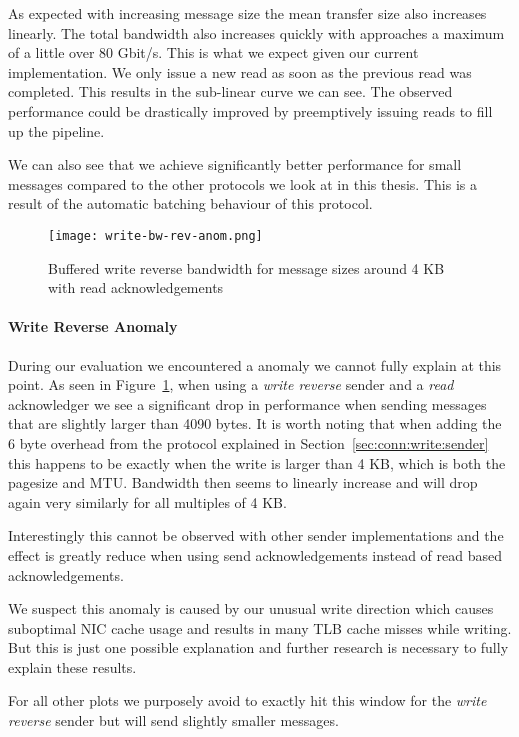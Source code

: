 As expected with increasing message size the mean transfer size also increases linearly. The total bandwidth 
also increases quickly with approaches a maximum of a little over 80 Gbit/s. This is what we expect given our current 
implementation. We only issue a new read as soon as the previous read was completed. This results in the sub-linear
curve we can see. The observed performance could be drastically improved by preemptively issuing reads to fill up
the pipeline.

We can also see that we achieve significantly better performance for small messages compared to the other protocols we
look at in this thesis. This is a result of the automatic batching behaviour of this protocol. 


\begin{figure}[h]
\texttt{[image: write-bw-rev-anom.png]}
\caption{Buffered write reverse bandwidth for message sizes around 4 KB with read acknowledgements}
\label{fig:plot-write-rev-anom}
\end{figure}

\paragraph{Write Reverse Anomaly} During our evaluation we encountered a anomaly we cannot fully explain at
this point. As seen in Figure~\ref{fig:plot-write-rev-anom}, when using a \emph{write reverse} sender and a 
\emph{read} acknowledger we see a significant drop in performance when sending messages that are slightly larger
than 4090 bytes. It is worth noting that when adding the 6 byte overhead from the protocol explained in 
Section~\ref{sec:conn:write:sender} this happens to be exactly when the write is larger than 4 KB, 
which is both the pagesize and MTU. Bandwidth then seems to linearly increase and will drop again very similarly 
for all multiples of 4 KB.

Interestingly this cannot be observed with other sender implementations and the effect is greatly
reduce when using send acknowledgements instead of read based acknowledgements.

We suspect this anomaly is caused by our unusual write direction which causes suboptimal NIC cache usage and 
results in many TLB cache misses while writing. But this is just one possible explanation and further research is 
necessary to fully explain these results.

For all other plots we purposely avoid to exactly hit this window for the \emph{write reverse}
sender but will send slightly smaller messages.


